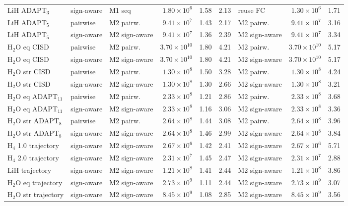 \documentclass[aps,pra,reprint,superscriptaddress,nofootinbib]{revtex4-2}
\begin{document}
\begin{table}[!htb]
\begin{tabular}{lllrrrlrr}
LiH ADAPT$_3$ & sign-aware & M1 seq & $1.80\times10^{6}$ & 1.58 & 2.13 & reuse FC & $1.30\times10^{6}$ & 1.71 \\
LiH ADAPT$_5$ & pairwise & M2 pairw. & $9.41\times10^{7}$ & 1.43 & 2.17 & M2 pairw. & $9.41\times10^{7}$ & 3.16 \\
LiH ADAPT$_5$ & sign-aware & M2 sign-aware & $9.41\times10^{7}$ & 1.36 & 2.39 & M2 sign-aware & $9.41\times10^{7}$ & 3.34 \\
H$_2$O eq CISD & pairwise & M2 pairw. & $3.70\times10^{10}$ & 1.80 & 4.21 & M2 pairw. & $3.70\times10^{10}$ & 5.17 \\
H$_2$O eq CISD & sign-aware & M2 sign-aware & $3.70\times10^{10}$ & 1.80 & 4.21 & M2 sign-aware & $3.70\times10^{10}$ & 5.17 \\
H$_2$O str CISD & pairwise & M2 pairw. & $1.30\times10^{8}$ & 1.50 & 3.28 & M2 pairw. & $1.30\times10^{8}$ & 4.24 \\
H$_2$O str CISD & sign-aware & M2 sign-aware & $1.30\times10^{8}$ & 1.30 & 2.66 & M2 sign-aware & $1.30\times10^{8}$ & 3.21 \\
H$_2$O eq ADAPT$_{11}$ & pairwise & M2 pairw. & $2.33\times10^{8}$ & 1.21 & 2.86 & M2 pairw. & $2.33\times10^{8}$ & 3.68 \\
H$_2$O eq ADAPT$_{11}$ & sign-aware & M2 sign-aware & $2.33\times10^{8}$ & 1.16 & 3.06 & M2 sign-aware & $2.33\times10^{8}$ & 3.36 \\
H$_2$O str ADAPT$_8$ & pairwise & M2 pairw. & $2.64\times10^{8}$ & 1.44 & 3.08 & M2 pairw. & $2.64\times10^{8}$ & 3.96 \\
H$_2$O str ADAPT$_8$ & sign-aware & M2 sign-aware & $2.64\times10^{8}$ & 1.46 & 2.99 & M2 sign-aware & $2.64\times10^{8}$ & 3.84 \\
\midrule
H$_4$ 1.0 trajectory & sign-aware & M2 sign-aware & $2.67\times10^{6}$ & 1.42 & 2.41 & M2 sign-aware & $2.67\times10^{6}$ & 5.71 \\
H$_4$ 2.0 trajectory & sign-aware & M2 sign-aware & $2.31\times10^{7}$ & 1.45 & 2.47 & M2 sign-aware & $2.31\times10^{7}$ & 2.88 \\
LiH trajectory & sign-aware & M2 sign-aware & $1.21\times10^{8}$ & 1.41 & 2.44 & M2 sign-aware & $1.21\times10^{8}$ & 3.86 \\
H$_2$O eq trajectory & sign-aware & M2 sign-aware & $2.73\times10^{9}$ & 1.11 & 2.44 & M2 sign-aware & $2.73\times10^{9}$ & 3.07 \\
H$_2$O str trajectory & sign-aware & M2 sign-aware & $8.45\times10^{9}$ & 1.08 & 2.85 & M2 sign-aware & $8.45\times10^{9}$ & 3.56 \\
\bottomrule
\end{tabular}
\end{table}
\end{document}
